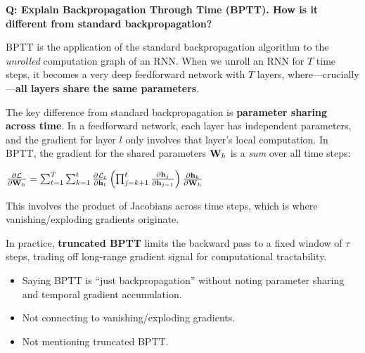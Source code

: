 \begin{interviewq}
\end{interviewq}

\begin{interviewq}
\textbf{Q: Explain Backpropagation Through Time (BPTT). How is it
different from standard backpropagation?}

 \quad {} \quad
\badgefreq{\freqmed}

\stronganswer
BPTT is the application of the standard backpropagation algorithm to the
\emph{unrolled} computation graph of an RNN.  When we unroll an RNN for
$T$ time steps, it becomes a very deep feedforward network with $T$
layers, where---crucially---\textbf{all layers share the same parameters}.

The key difference from standard backpropagation is \textbf{parameter
sharing across time}.  In a feedforward network, each layer has
independent parameters, and the gradient for layer $l$ only involves that
layer's local computation.  In BPTT, the gradient for the shared
parameters $\mathbf{W}_h$ is a \emph{sum} over all time steps:

$\frac{\partial \mathcal{L}}{\partial \mathbf{W}_h}
= \sum_{t=1}^{T} \sum_{k=1}^{t}
  \frac{\partial \mathcal{L}_t}{\partial \mathbf{h}_t}
  \left(\prod_{j=k+1}^{t}
    \frac{\partial \mathbf{h}_j}{\partial \mathbf{h}_{j-1}}
  \right)
  \frac{\partial \mathbf{h}_k}{\partial \mathbf{W}_h}$

This involves the product of Jacobians across time steps, which is where
vanishing/exploding gradients originate.

In practice, \textbf{truncated BPTT} limits the backward pass to a
fixed window of $\tau$ steps, trading off long-range gradient signal for
computational tractability.

\redflags
\begin{itemize}
\item Saying BPTT is ``just backpropagation'' without noting parameter
  sharing and temporal gradient accumulation.
\item Not connecting to vanishing/exploding gradients.
\item Not mentioning truncated BPTT.
\end{itemize}



\end{interviewq}
